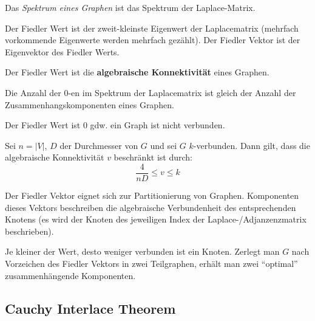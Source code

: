 \begin{definition}
    Das \textit{Spektrum eines Graphen} ist das Spektrum der Laplace-Matrix.
\end{definition}

\begin{definition}
    Der Fiedler Wert ist der zweit-kleinste Eigenwert der Laplacematrix (mehrfach vorkommende Eigenwerte werden mehrfach gezählt).
    Der Fiedler Vektor ist der Eigenvektor des Fiedler Werts.

    Der Fiedler Wert ist die \textbf{algebraische Konnektivität} eines Graphen.
\end{definition}

\begin{proposition}
    Die Anzahl der 0-en im Spektrum der Laplacematrix ist gleich der Anzahl der Zusammenhangskomponenten eines Graphen.
\end{proposition}

\begin{corollary}
    Der Fiedler Wert ist 0 gdw. ein Graph ist nicht verbunden.
\end{corollary}

\begin{observation}
    Sei $ n = |V| $, $ D $ der Durchmesser von $ G $ und sei $ G $ $ k $-verbunden.
    Dann gilt, dass die algebraische Konnektivität $ v $ beschränkt ist durch:
    \begin{equation*}
        \frac{4}{nD} \leq v \leq k
    \end{equation*}
\end{observation}

\begin{observation}
    Der Fiedler Vektor eignet sich zur Partitionierung von Graphen.
    Komponenten dieses Vektors beschreiben die algebraische Verbundenheit des entsprechenden Knotens (es wird der Knoten des jeweiligen Index der Laplace-/Adjanzenzmatrix beschrieben).

    Je kleiner der Wert, desto weniger verbunden ist ein Knoten.
    Zerlegt man $ G $ nach Vorzeichen des Fiedler Vektors in zwei Teilgraphen, erhält man zwei ``optimal'' zusammenhängende Komponenten.
\end{observation}

\subsection{Cauchy Interlace Theorem}

